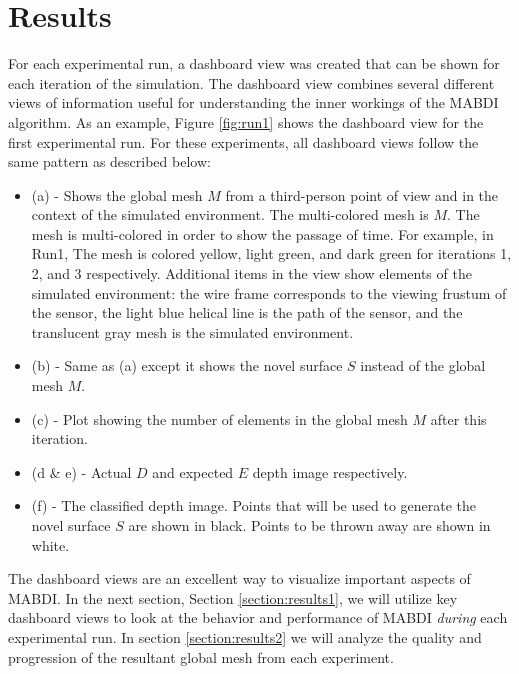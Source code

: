 \chapter{Results} \label{chapter:results}


For each experimental run, a dashboard view was created that can be shown for
each iteration of the simulation. The dashboard view combines several different
views of information useful for understanding the inner workings of the MABDI
algorithm. As an example, Figure \ref{fig:run1} shows the dashboard view for the
first experimental run. For these experiments, all dashboard views follow the
same pattern as described below:

\begin{itemize}
  \item (a) - Shows the global mesh $M$ from a third-person point of view and in
  the context of the simulated environment. The multi-colored mesh is $M$. The
  mesh is multi-colored in order to show the passage of time. For example, in
  Run1, The mesh is colored yellow, light green, and dark green for iterations
  1, 2, and 3 respectively. Additional items in the view show elements of the
  simulated environment: the wire frame corresponds to the viewing frustum of
  the sensor, the light blue helical line is the path of the sensor, and the
  translucent gray mesh is the simulated environment.
  \item (b) - Same as (a) except it shows the novel surface $S$ instead of
  the global mesh $M$.
  \item (c) - Plot showing the number of elements in the global mesh $M$
  after this iteration.
  \item (d \& e) - Actual $D$ and expected $E$ depth image
  respectively.
  \item (f) - The classified depth image. Points that will be used to generate
  the novel surface $S$ are shown in black. Points to be thrown away are shown
  in white.
\end{itemize}

The dashboard views are an excellent way to visualize important aspects of
MABDI. In the next section, Section \ref{section:results1}, we will utilize key
dashboard views to look at the behavior and performance of MABDI \emph{during}
each experimental run. In section \ref{section:results2} we will analyze the
quality and progression of the resultant global mesh from each experiment. 

